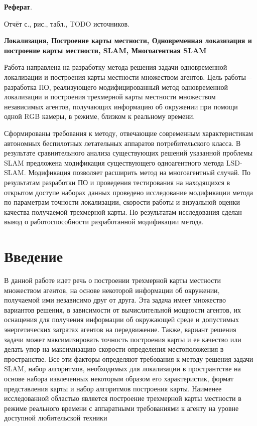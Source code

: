 



\textbf{\large{Реферат}}.

Отчёт \pageref{LastPage}с., \totalfigures рис., \totaltables табл., 
TODO источников.

\noindent \textbf{ Локализация, Построение карты местности, Одновременная локазизация и построение карты местности, SLAM, Многоагентная SLAM }

Работа направлена на разработку метода решения задачи одновременной локализации и построения карты местности множеством агентов.
Цель работы -- разработка ПО, реализующего модифицированный метод одновременной локализации и построения трехмерной карты местности множеством независимых агентов, получающих информацию об окружении при помощи одной RGB камеры, в режиме, близком к реальному времени.

Сформированы требования к методу, отвечающие современным характеристикам автономных беспилотных летательных аппаратов потребительского класса. В результате сравнительного анализа существующих решений указанной проблемы SLAM предложена модификация существующего одноагентного метода LSD-SLAM. Модификация позволяет расширить метод на многоагентный случай. По результатам разработки ПО и проведения тестирования на находящихся в открытом доступе наборах данных проведено исследование модификации метода по параметрам точности локализации, скорости работы и визуальной оценки качества получаемой трехмерной карты. По результатам исследования сделан вывод о работоспособности разработанной модификации метода.

\setcounter{page}{5}
\tableofcontents

\section{Введение}
В данной работе идет речь о построении трехмерной карты местности множеством агентов, на основе некоторой информации об окружении, получаемой ими независимо друг от друга. Эта задача имеет множество
вариантов решения, в зависимости от вычислительной мощности агентов, их оснащения для получения информации об окружающей среде и допустимых энергетических затратах агентов на передвижение. Также, вариант решения задачи может максимизировать точность построения карты и ее качество или делать упор на максимизацию скорости определения местоположения в пространстве. Все эти факторы определяют требования к методу
решения задачи SLAM, набор алгоритмов, необходимых для локализации в пространтстве на основе набора извлеченных некоторым образом его характеристик, формат представления карты и набор алгоритмов построения карты. Наименее исследованной областью является построение трехмерной карты местности в режиме реального времени с аппаратными требованиями к агенту на уровне доступной любительской техники~\cite{SLAMoverview}


